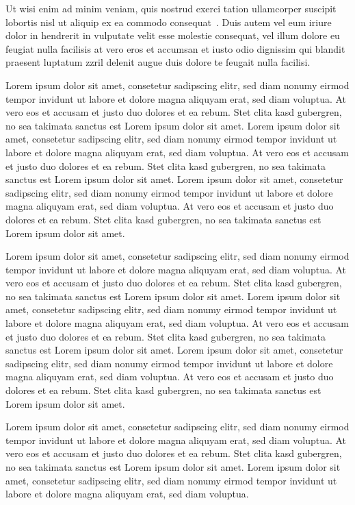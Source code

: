 \documentclass[journal]{vgtc}
\begin{document}
Ut wisi enim ad minim veniam, quis nostrud exerci tation ullamcorper
suscipit lobortis nisl ut aliquip ex ea commodo
consequat~\cite{levoy:1989:DSV}. Duis autem vel eum iriure dolor in
hendrerit in vulputate velit esse molestie consequat, vel illum dolore
eu feugiat nulla facilisis at vero eros et accumsan et iusto odio
dignissim qui blandit praesent luptatum zzril delenit augue duis
dolore te feugait nulla facilisi.

Lorem ipsum dolor sit amet, consetetur sadipscing elitr, sed diam
nonumy eirmod tempor invidunt ut labore et dolore magna aliquyam erat,
sed diam voluptua. At vero eos et accusam et justo duo dolores et ea
rebum. Stet clita kasd gubergren, no sea takimata sanctus est Lorem
ipsum dolor sit amet. Lorem ipsum dolor sit amet, consetetur
sadipscing elitr, sed diam nonumy eirmod tempor invidunt ut labore et
dolore magna aliquyam erat, sed diam voluptua. At vero eos et accusam
et justo duo dolores et ea rebum. Stet clita kasd gubergren, no sea
takimata sanctus est Lorem ipsum dolor sit amet. Lorem ipsum dolor sit
amet, consetetur sadipscing elitr, sed diam nonumy eirmod tempor
invidunt ut labore et dolore magna aliquyam erat, sed diam
voluptua. At vero eos et accusam et justo duo dolores et ea
rebum. Stet clita kasd gubergren, no sea takimata sanctus est Lorem
ipsum dolor sit amet.

Lorem ipsum dolor sit amet, consetetur sadipscing elitr, sed diam
nonumy eirmod tempor invidunt ut labore et dolore magna aliquyam erat,
sed diam voluptua. At vero eos et accusam et justo duo dolores et ea
rebum. Stet clita kasd gubergren, no sea takimata sanctus est Lorem
ipsum dolor sit amet. Lorem ipsum dolor sit amet, consetetur
sadipscing elitr, sed diam nonumy eirmod tempor invidunt ut labore et
dolore magna aliquyam erat, sed diam voluptua. At vero eos et accusam
et justo duo dolores et ea rebum. Stet clita kasd gubergren, no sea
takimata sanctus est Lorem ipsum dolor sit amet. Lorem ipsum dolor sit
amet, consetetur sadipscing elitr, sed diam nonumy eirmod tempor
invidunt ut labore et dolore magna aliquyam erat, sed diam
voluptua. At vero eos et accusam et justo duo dolores et ea
rebum. Stet clita kasd gubergren, no sea takimata sanctus est Lorem
ipsum dolor sit amet.

Lorem ipsum dolor sit amet, consetetur sadipscing elitr, sed diam
nonumy eirmod tempor invidunt ut labore et dolore magna aliquyam erat,
sed diam voluptua. At vero eos et accusam et justo duo dolores et ea
rebum. Stet clita kasd gubergren, no sea takimata sanctus est Lorem
ipsum dolor sit amet. Lorem ipsum dolor sit amet, consetetur
sadipscing elitr, sed diam nonumy eirmod tempor invidunt ut labore et
dolore magna aliquyam erat, sed diam voluptua.
\end{document}
